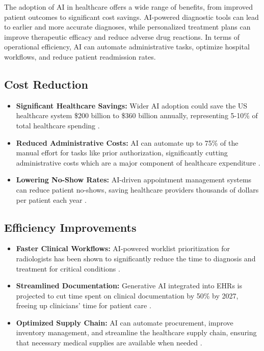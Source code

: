 The adoption of AI in healthcare offers a wide range of benefits, from improved patient outcomes to significant cost savings. AI-powered diagnostic tools can lead to earlier and more accurate diagnoses, while personalized treatment plans can improve therapeutic efficacy and reduce adverse drug reactions. In terms of operational efficiency, AI can automate administrative tasks, optimize hospital workflows, and reduce patient readmission rates.

\subsection{Cost Reduction}
\begin{itemize}
    \item \textbf{Significant Healthcare Savings:} Wider AI adoption could save the US healthcare system \$200 billion to \$360 billion annually, representing 5-10\% of total healthcare spending \cite{NBER_AIBenefits}.
    \item \textbf{Reduced Administrative Costs:} AI can automate up to 75\% of the manual effort for tasks like prior authorization, significantly cutting administrative costs which are a major component of healthcare expenditure \cite{Caliper_AIBenefits}.
    \item \textbf{Lowering No-Show Rates:} AI-driven appointment management systems can reduce patient no-shows, saving healthcare providers thousands of dollars per patient each year \cite{TechMagic_AIBenefits}.
\end{itemize}

\subsection{Efficiency Improvements}
\begin{itemize}
    \item \textbf{Faster Clinical Workflows:} AI-powered worklist prioritization for radiologists has been shown to significantly reduce the time to diagnosis and treatment for critical conditions \cite{Aidoc_AIBenefits}.
    \item \textbf{Streamlined Documentation:} Generative AI integrated into EHRs is projected to cut time spent on clinical documentation by 50\% by 2027, freeing up clinicians' time for patient care \cite{Keragon_AIBenefits}.
    \item \textbf{Optimized Supply Chain:} AI can automate procurement, improve inventory management, and streamline the healthcare supply chain, ensuring that necessary medical supplies are available when needed \cite{Kyndryl_AIBenefits}.
\end{itemize}

